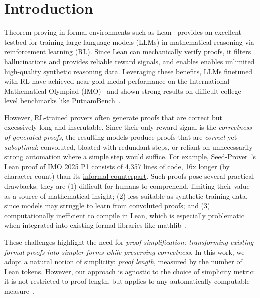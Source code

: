 \section{Introduction}
Theorem proving in formal environments such as Lean~\citep{lean} provides an excellent testbed for training large language models (LLMs) in mathematical reasoning via reinforcement learning (RL). Since Lean can mechanically verify proofs, it filters hallucinations and provides reliable reward signals, and enables enables unlimited high-quality synthetic reasoning data. Leveraging these benefits, LLMs finetuned with RL have achieved near gold-medal performance on the International Mathematical Olympiad (IMO)~\citep{chen2507seed} and shown strong results on difficult college-level benchmarks like PutnamBench~\citep{lin2025goedel2}.

However, RL-trained provers often generate proofs that are correct but excessively long and inscrutable. Since their only reward signal is the \textit{correctness of generated proofs}, the resulting models produce proofs that are \textit{correct} yet \textit{suboptimal}: convoluted, bloated with redundant steps, or reliant on unnecessarily strong automation where a simple step would suffice. For example, Seed-Prover~\citep{chen2507seed}'s \href{https://github.com/ByteDance-Seed/Seed-Prover/blob/17f89e327e4f90f46b0af385efc233dbbe71f8bb/SeedProver/imo2025/IMO2025/P1.lean}{Lean proof of IMO 2025 P1} consists of 4,357 lines of code, 16x longer (by character count) than its \href{https://github.com/ByteDance-Seed/Seed-Prover/blob/17f89e327e4f90f46b0af385efc233dbbe71f8bb/SeedProver/imo2025/p1_proof.pdf}{informal counterpart}. Such proofs pose several practical drawbacks: they are 
(1) difficult for humans to comprehend, limiting their value as a source of mathematical insight; (2) less suitable as synthetic training data, since models may struggle to learn from convoluted proofs; and
(3) computationally inefficient to compile in Lean, which is especially problematic when integrated into existing formal libraries like mathlib~\citep{mathlib}. 

These challenges highlight the need for \emph{proof simplification: transforming existing formal proofs into simpler forms while preserving correctness}. In this work, we adopt a natural notion of simplicity: \textit{proof length}, measured by the number of Lean tokens. However, our approach is agnostic to the choice of simplicity metric: it is not restricted to proof length, but applies to any automatically computable measure~\citep{kinyon-proof-simp}. 

